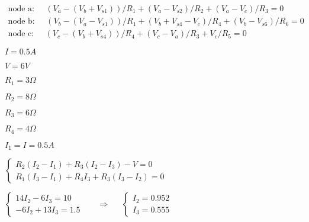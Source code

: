 \documentclass{article}
\def\lthtmlcheckvsize{\ifdim\ht\sizebox<\vsize 
  \ifdim\wd\sizebox<\hsize\expandafter\hfill\fi \expandafter\vfill
  \else\expandafter\vss\fi}%
\begin{document}
{\newpage\clearpage
{}%
\begin{displaymath}\begin{array}{l}
\mbox{node a:}\;\;\;\;\;(V_a-(V_b+V_{s1}))/R_1+(V_a-V_{s2})/R_2+(V_a-V_c)/R_3=0 \\
\mbox{node b:}\;\;\;\;\;(V_b-(V_a-V_{s1}))/R_1+(V_b+V_{s4}-V_c)/R_4+(V_b-V_{s6})/R_6=0 \\
\mbox{node c:}\;\;\;\;\;(V_c-(V_b+V_{s4}))/R_4+(V_c-V_a)/R_3+V_c/R_5=0
\end{array}\end{displaymath}%
\lthtmldisplayZ
\lthtmlcheckvsize\clearpage}

{\newpage\clearpage
{}%
$ I=0.5 A$%
\lthtmlindisplaymathZ
\lthtmlcheckvsize\clearpage}

{\newpage\clearpage
{}%
$ V=6 V$%
\lthtmlindisplaymathZ
\lthtmlcheckvsize\clearpage}

{\newpage\clearpage
{}%
$ R_1=3\Omega$%
\lthtmlindisplaymathZ
\lthtmlcheckvsize\clearpage}

{\newpage\clearpage
{}%
$ R_2=8\Omega$%
\lthtmlindisplaymathZ
\lthtmlcheckvsize\clearpage}

{\newpage\clearpage
{}%
$ R_3=6\Omega$%
\lthtmlindisplaymathZ
\lthtmlcheckvsize\clearpage}

{\newpage\clearpage
{}%
$ R_4=4\Omega$%
\lthtmlindisplaymathZ
\lthtmlcheckvsize\clearpage}

{\newpage\clearpage
{}%
$ I_1=I=0.5A$%
\lthtmlindisplaymathZ
\lthtmlcheckvsize\clearpage}

{\newpage\clearpage
{}%
$\displaystyle \left\{ \begin{array}{l} R_2(I_2-I_1)+R_3(I_2-I_3)-V=0 \\
R_1(I_3-I_1)+R_4I_3+R_3(I_3-I_2)=0 \end{array} \right.$%
\lthtmlindisplaymathZ
\lthtmlcheckvsize\clearpage}

{\newpage\clearpage
{}%
$\displaystyle \left\{ \begin{array}{l}
14 I_2-6 I_3=10 \\-6 I_2+13 I_3=1.5 \end{array} \right.
\;\;\;\;\;\;\Longrightarrow \;\;\;\;\;
\left\{ \begin{array}{l}
I_2=0.952 \\I_3=0.555 \end{array} \right.$%
\lthtmlindisplaymathZ
\lthtmlcheckvsize\clearpage}
\end{document}
